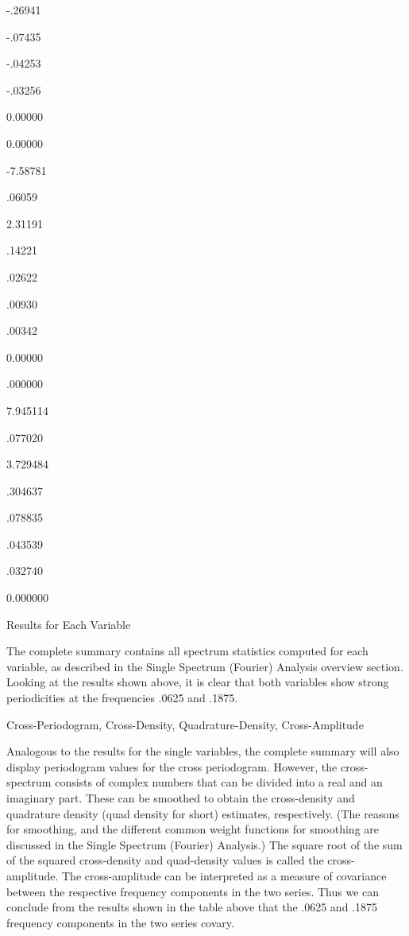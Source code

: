-.26941

-.07435

-.04253

-.03256

0.00000
 

0.00000

-7.58781

.06059

2.31191

.14221

.02622

.00930

.00342

0.00000
 

.000000

7.945114

.077020

3.729484

.304637

.078835

.043539

.032740

0.000000
 


Results for Each Variable

The complete summary contains all spectrum statistics computed for each variable, as described in the Single Spectrum (Fourier) Analysis overview section. Looking at the results shown above, it is clear that both variables show strong periodicities at the frequencies .0625 and .1875.

Cross-Periodogram, Cross-Density, Quadrature-Density, Cross-Amplitude

Analogous to the results for the single variables, the complete summary will also display periodogram values for the cross periodogram. However, the cross-spectrum consists of complex numbers that can be divided into a real and an imaginary part. These can be smoothed to obtain the cross-density and quadrature density (quad density for short) estimates, respectively. (The reasons for smoothing, and the different common weight functions for smoothing are discussed in the Single Spectrum (Fourier) Analysis.) The square root of the sum of the squared cross-density and quad-density values is called the cross- amplitude. The cross-amplitude can be interpreted as a measure of covariance between the respective frequency components in the two series. Thus we can conclude from the results shown in the table above that the .0625 and .1875 frequency components in the two series covary.

